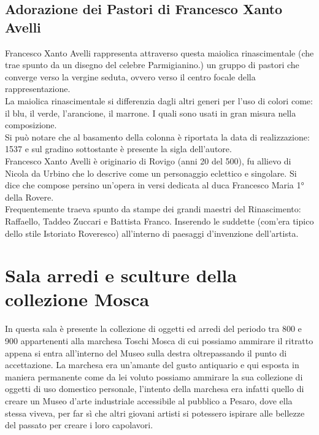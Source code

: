 \documentclass[12pt,a4paper]{article}
\begin{document}
	\subsection{Adorazione dei Pastori di Francesco Xanto Avelli}
	Francesco Xanto Avelli rappresenta attraverso questa maiolica rinascimentale (che trae spunto da un disegno del celebre Parmigianino.) un gruppo di pastori che converge verso la vergine seduta, ovvero verso il centro focale della rappresentazione.\\
	La maiolica rinascimentale si differenzia dagli altri generi per l'uso di colori come: il blu, il verde, l’arancione, il marrone. I quali sono usati in gran misura nella composizione.\\
	Si può notare che al basamento della colonna è riportata la data di realizzazione: 1537 e sul gradino sottostante è presente la sigla dell'autore.\\
	Francesco Xanto Avelli è originario di Rovigo (anni 20 del 500), fu allievo di Nicola da Urbino che lo descrive come un personaggio eclettico e singolare. Si dice che compose persino un’opera in versi dedicata al duca Francesco Maria 1° della Rovere.\\
	Frequentemente traeva spunto da stampe dei grandi maestri del Rinascimento: Raffaello, Taddeo Zuccari e Battista Franco. Inserendo le suddette (com'era tipico dello stile Istoriato Roveresco) all'interno di paesaggi d'invenzione dell'artista.
	
	\section{Sala arredi e sculture della collezione Mosca}
	In questa sala è presente la collezione di oggetti ed arredi del periodo tra 800 e 900 appartenenti alla marchesa  Toschi Mosca di cui possiamo ammirare il ritratto appena si entra all'interno del Museo sulla destra oltrepassando il punto di accettazione. La marchesa era un'amante del gusto antiquario e qui esposta in maniera permanente come da lei voluto possiamo ammirare la sua collezione di oggetti di uso domestico personale, l'intento della marchesa era infatti quello di creare un Museo d'arte industriale accessibile al pubblico a Pesaro, dove ella stessa viveva, per far sì che altri giovani artisti si potessero ispirare alle bellezze del passato per creare i loro capolavori.
\end{document}

